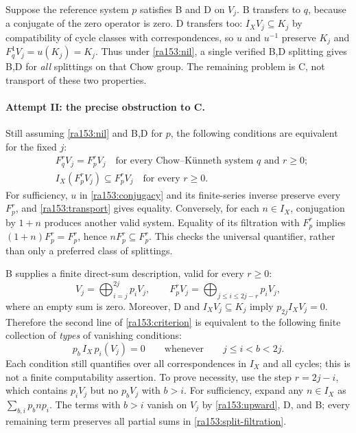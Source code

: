 \documentclass[11pt]{article}
\begin{document}
Suppose the reference system $p$ satisfies B and D on $V_j$.  B transfers to
$q$, because a conjugate of the zero operator is zero.  D transfers too:
$I_X V_j\subseteq K_j$ by compatibility of cycle classes with correspondences,
so $u$ and $u^{-1}$ preserve $K_j$ and
$F_q^1V_j=u(K_j)=K_j$.  Thus under \eqref{ra153:nil}, a single verified B,D
splitting gives B,D for \emph{all} splittings on that Chow group.  The
remaining problem is C, not transport of these two properties.

\paragraph{Attempt II: the precise obstruction to C.}
Still assuming \eqref{ra153:nil} and B,D for $p$, the following conditions are
equivalent for the fixed $j$:
\begin{equation}\label{ra153:criterion}
 \begin{aligned}
 &F_q^r V_j=F_p^r V_j\quad\text{for every Chow--K\"unneth system $q$ and $r\geq0$};\\
 &I_X(F_p^r V_j)\subseteq F_p^r V_j\quad\text{for every $r\geq0$}.
 \end{aligned}
\end{equation}
For sufficiency, $u$ in \eqref{ra153:conjugacy} and its finite-series inverse
preserve every $F_p^r$, and \eqref{ra153:transport} gives equality.  Conversely,
for each $n\in I_X$, conjugation by $1+n$ produces another valid system.
Equality of its filtration with $F_p^r$ implies
$(1+n)F_p^r=F_p^r$, hence $nF_p^r\subseteq F_p^r$.  This checks the universal
quantifier, rather than only a preferred class of splittings.

B supplies a finite direct-sum description, valid for every $r\geq0$:
\begin{equation}\label{ra153:split-filtration}
 V_j=\bigoplus_{i=j}^{2j}p_iV_j,\qquad
 F_p^rV_j=\bigoplus_{j\leq i\leq 2j-r}p_iV_j,
\end{equation}
where an empty sum is zero.  Moreover, D and $I_XV_j\subseteq K_j$ imply
$p_{2j}I_XV_j=0$.  Therefore the second line of
\eqref{ra153:criterion} is equivalent to the following finite collection of
\emph{types} of vanishing conditions:
\begin{equation}\label{ra153:upward}
 p_b\,I_X\,p_i(V_j)=0
 \qquad\text{whenever}\qquad j\leq i<b<2j.
\end{equation}
Each condition still quantifies over all correspondences in $I_X$ and all
cycles; this is not a finite computability assertion.
To prove necessity, use the step $r=2j-i$, which contains $p_iV_j$ but no
$p_bV_j$ with $b>i$.  For sufficiency, expand any $n\in I_X$ as
$\sum_{b,i}p_b n p_i$.  The terms with $b>i$ vanish on $V_j$ by
\eqref{ra153:upward}, D, and B; every remaining term preserves all partial sums
in \eqref{ra153:split-filtration}.
\end{document}
